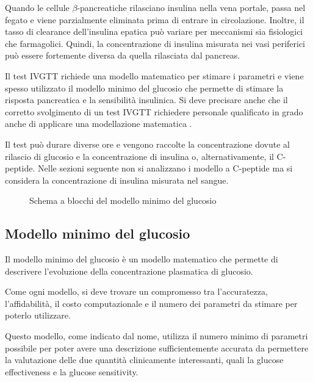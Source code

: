 Quando le cellule $\beta$-pancreatiche rilasciano insulina nella vena portale, passa nel fegato e viene parzialmente eliminata prima di entrare in circolazione. Inoltre, il tasso di clearance dell'insulina epatica può variare per meccanismi sia fisiologici che farmagolici. Quindi, la concentrazione di insulina misurata nei vasi periferici può essere fortemente diversa da quella rilasciata dal pancreas.

Il test IVGTT richiede una modello matematico per stimare i parametri e viene spesso utilizzato il modello minimo del glucosio che permette di stimare la risposta pancreatica e la sensibilità insulinica. Si deve precisare anche che il corretto svolgimento di un test IVGTT richiedere personale qualificato in grado anche di applicare una modellazione matematica \cite{cersosimo_assessment_nodate}. 

Il test può durare diverse ore e vengono raccolte la concentrazione dovute al rilascio di glucosio e la concentrazione di insulina o, alternativamente, il C-peptide. Nelle sezioni seguente non si analizzano i modello a C-peptide ma si considera la concentrazione di insulina misurata nel sangue.





\begin{figure}[t!]
	\centering
		\scriptsize{\def\svgwidth{0.95\linewidth}
		}
	\caption{Schema a blocchi del modello minimo del glucosio}
	\label{fig:modellominimo}
\end{figure}


\subsection{Modello minimo del glucosio}



Il modello minimo del glucosio è un modello matematico che permette di descrivere l'evoluzione della concentrazione plasmatica di glucosio. 

Come ogni modello, si deve trovare un compromesso tra l'accuratezza, l'affidabilità, il costo computazionale e il numero dei parametri da stimare per poterlo utilizzare. 

Questo modello, come indicato dal nome, utilizza il numero minimo di parametri possibile per poter avere una descrizione sufficientemente accurata da permettere la valutazione delle due quantità clinicamente interessanti, quali la glucose effectiveness e la glucose sensitivity. 


